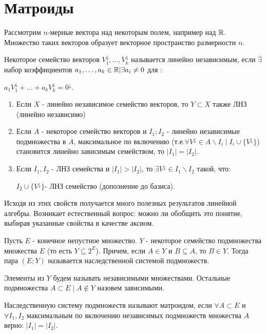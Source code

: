 \section {Матроиды}
Рассмотрим $n$-мерные вектора над некоторым полем, например над $\mathbb{R}$. Множество таких векторов образует векторное пространство размерности $n$.\par
Некоторое семейство векторов $V^{\downarrow}_1,\ldots, V^{\downarrow}_k$ называется линейно независимым, если $\overline{\exists}$ набор коэффициентов $a_1, \ldots, a_k \in \mathbb{R} | \exists a_i \neq 0$ для : \par $a_1V^{\downarrow}_1 + \ldots + a_kV^{\downarrow}_k = 0^{\downarrow}$.\\ 

\prok 
\begin{enumerate}
\item Если $X$ - линейно независимое семейство векторов, то $Y \subset X$ также ЛНЗ (линейно независимо) 
\item Если $A$ - некоторое семейство векторов и $I_1;I_2$ - линейно независимые подмножества в $A$, максимальное по включению (т.е.$\forall V^{\downarrow} \in A \backslash I_i \mid I_i\cup \{ V^{\downarrow} \} $) становится линейно зависимым семейством, то $|I_1| = |I_2|$.
\item Если $I_1,I_2$ - ЛНЗ семейства и $|I_1| > |I_2|$, то $\exists V^{\downarrow} \in I_1 \backslash I_2 $ такой, что:\par 
$I_2 \cup \{ V^{\downarrow} \} $- ЛНЗ семейство (дополнение до базиса).                                                             
\end{enumerate}

\note Исходя из этих свойств получается много полезных результатов линейной алгебры. Возникает естественный вопрос: можно ли обобщить это понятие, выбирая указанные свойства в качестве аксиом. 

\opr Пусть $E $ - конечное непустное множество. $Y$ - некоторое семейство подмножества множества $E$ (то есть $Y \subseteq 2^E$). Причем, если $A \in Y$ и $ B \subseteq A$, то $ B \in Y$. Тогда пара $(E;Y)$ называется наследственной системой подмножеств.

\opr Элементы из $Y$ будем называть независимыми множествами. Остальные подмножества $A \subset E \mid A \notin Y $ назовем зависимыми.

\opr Наследственную систему подмножеств называют матроидом, если $ \forall A \subset E$ и $ \forall I_1,I_2$ максимальным по включению независимых подмножеств множества $A$ верно: $|I_1| = |I_2|$.

